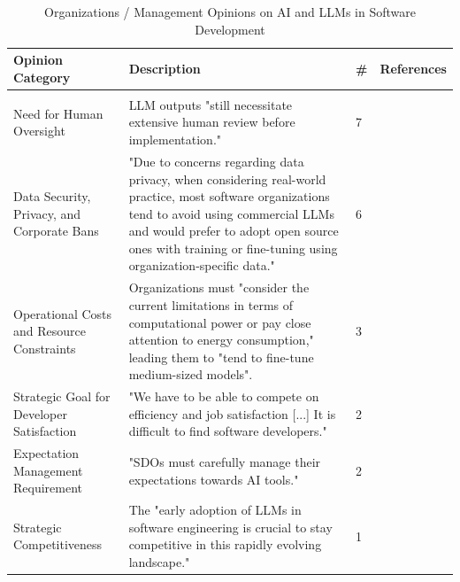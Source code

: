 {\small
\begin{longtable}{>{\raggedright\arraybackslash}p{3.3cm} p{8.8cm}  p{0.2cm} p{1.8cm}}
\caption{Organizations / Management Opinions on AI and LLMs in Software Development}
\label{tab:stakeholder_opinions_orgs} \\

\toprule
\textbf{Opinion Category} & \textbf{Description} & \textbf{\#} & \textbf{References} \\
\midrule
\endfirsthead

\midrule
\multicolumn{4}{r}{\textit{Continued on next page}}\\
\bottomrule
\endfoot

\bottomrule
\endlastfoot

Need for Human Oversight & LLM outputs "still necessitate extensive human review before implementation." \cite{Kim:2025ao} & 7 & \cite{Qiu:2025ft, Kim:2025ao, Zhang:2025ea, Basha:2025tt, Terragni:2025fa, Kim:2025is, AlHashimi:2025er} \\ \addlinespace
Data Security, Privacy, and Corporate Bans & "Due to concerns regarding data privacy, when considering real-world practice, most software organizations tend to avoid using commercial LLMs and would prefer to adopt open source ones with training or fine-tuning using organization-specific data." \cite{Wang:2025rs} & 6 & \cite{Banh:2025cf, Wang:2025rs, Terragni:2025fa, Yoo:2025sa, Hemmat:2025rd, Basha:2025tt} \\ \addlinespace
Operational Costs and Resource Constraints & Organizations must "consider the current limitations in terms of computational power or pay close attention to energy consumption," leading them to "tend to fine-tune medium-sized models".\cite{Wang:2025rs} & 3 & \cite{Banh:2025cf, Wang:2025rs, Hemmat:2025rd} \\ \addlinespace
Strategic Goal for Developer Satisfaction & "We have to be able to compete on efficiency and job satisfaction [...] It is difficult to find software developers." \cite{Jensen:2025me} & 2 & \cite{Haque:2025la, Jensen:2025me} \\ \addlinespace
Expectation Management Requirement & "SDOs must carefully manage their expectations towards AI tools." \cite{Jensen:2025me} & 2 & \cite{Jensen:2025me, Basha:2025tt} \\ \addlinespace
Strategic Competitiveness & The "early adoption of LLMs in software engineering is crucial to stay competitive in this rapidly evolving landscape." \cite{Haque:2025la} & 1 & \cite{Haque:2025la} \\

\end{longtable}
}

